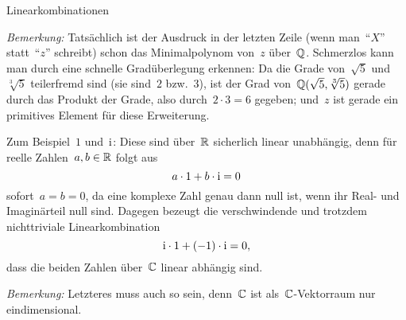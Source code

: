 \documentclass{algblatt}
\begin{document}
\begin{aufgabe}{Linearkombinationen}
\begin{loesungE}
\emph{Bemerkung:} Tatsächlich ist der Ausdruck in der letzten Zeile (wenn
man~"`$X$"' statt~"`$z$"' schreibt) schon das Minimalpolynom von~$z$
über~$\mathbb{Q}$. Schmerzlos kann man durch eine schnelle Gradüberlegung erkennen: Da
die Grade von~$\sqrt{5}$ und~$\sqrt[3]{5}$ teilerfremd sind (sie sind~$2$
bzw.~$3$), ist der Grad von~$\mathbb{Q}(\sqrt{5},\sqrt[3]{5})$ gerade durch das
Produkt der Grade, also durch~$2 \cdot 3 = 6$ gegeben; und~$z$ ist gerade ein
primitives Element für diese Erweiterung.

\item Zum Beispiel~$1$ und~$\mathrm{i}$: Diese sind über~$\mathbb{R}$ sicherlich linear
unabhängig, denn für reelle Zahlen~$a,b \in \mathbb{R}$ folgt aus
\[ a \cdot 1 + b \cdot \mathrm{i} = 0 \]
sofort~$a = b = 0$, da eine komplexe Zahl genau dann null ist, wenn ihr Real-
und Imaginärteil null sind. Dagegen bezeugt die verschwindende und trotzdem
nichttriviale Linearkombination
\[ \mathrm{i} \cdot 1 + (-1) \cdot \mathrm{i} = 0, \]
dass die beiden Zahlen über~$\mathbb{C}$ linear abhängig sind.

\emph{Bemerkung:} Letzteres muss auch so sein, denn~$\mathbb{C}$ ist
als~$\mathbb{C}$-Vektorraum nur eindimensional.
\end{loesungE}
\end{aufgabe}
\end{document}

